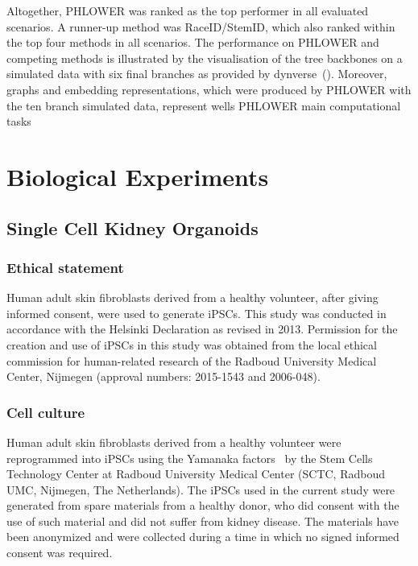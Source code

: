 Altogether, PHLOWER was ranked as the top performer in all evaluated scenarios. A runner-up method was RaceID/StemID, which also ranked within the top four methods in all scenarios. The performance on PHLOWER and competing methods is illustrated by the visualisation of the tree backbones on a simulated data with six final branches as provided by dynverse~(). Moreover, graphs and embedding representations, which were produced by PHLOWER with the ten branch simulated data, represent wells PHLOWER main computational tasks


\section{Biological Experiments}
\subsection{Single Cell Kidney Organoids}

\subsubsection{Ethical statement}

Human adult skin fibroblasts derived from a healthy volunteer, after giving informed consent, were used to generate iPSCs. This study was conducted in accordance with the Helsinki Declaration as revised in 2013. Permission for the creation and use of iPSCs in this study was obtained from the local ethical commission for human-related research of the Radboud University Medical Center, Nijmegen (approval numbers: 2015-1543 and 2006-048). 

\subsubsection{Cell culture}

Human adult skin fibroblasts derived from a healthy volunteer were reprogrammed into iPSCs using the Yamanaka factors~\citep{takahashi2006induction} by the Stem Cells Technology Center at Radboud University Medical Center (SCTC, Radboud UMC, Nijmegen, The Netherlands). The iPSCs used in the current study were generated from spare materials from a healthy donor, who did consent with the use of such material and did not suffer from kidney disease. The materials have been anonymized and were collected during a time in which no signed informed consent was required.

